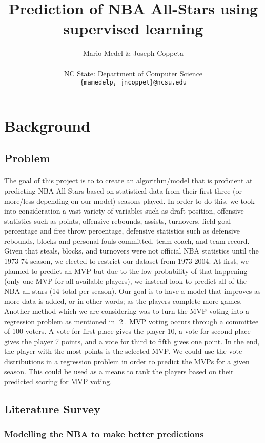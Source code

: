 \documentclass{article}
\title{Prediction of NBA All-Stars using supervised learning}
\author{
  Mario Medel \& Joseph Coppeta \\
  \\
  NC State: Department of Computer Science 
  \\
  \texttt{\{mamedelp, jncoppet\}@ncsu.edu}
}
\begin{document}
\maketitle

\section{Background}
\subsection{Problem}
\paragraph{}
The goal of this project is to to create an algorithm/model that is proficient at predicting NBA All-Stars based on statistical data from their first three (or more/less depending on our model) seasons played. In order to do this, we took into consideration a vast variety of variables such as draft position, offensive statistics such as points, offensive rebounds, assists, turnovers, field goal percentage and free throw percentage, defensive statistics such as defensive rebounds, blocks and personal fouls committed, team coach, and team record. Given that steals, blocks, and turnovers were not official NBA statistics until the 1973-74 season, we elected to restrict our dataset from 1973-2004. At first, we planned to predict an MVP but due to the low probability of that happening (only one MVP for all available players), we instead look to predict all of the NBA all stars (14 total per season). Our goal is to have a model that improves as more data is added, or in other words; as the players complete more games. Another method which we are considering was to turn the MVP voting into a regression problem as mentioned in [2]. MVP voting occurs through a committee of 100 voters. A vote for first place gives the player 10, a vote for second place gives the player 7 points, and a vote for third to fifth gives one point. In the end, the player with the most points is the selected MVP. We could use the vote distributions in a regression problem in order to predict the MVPs for a given season. This could be used as a means to rank the players based on their predicted scoring for MVP voting.

\subsection{Literature Survey}
\subsubsection*{Modelling the NBA to make better predictions}
\end{document}
